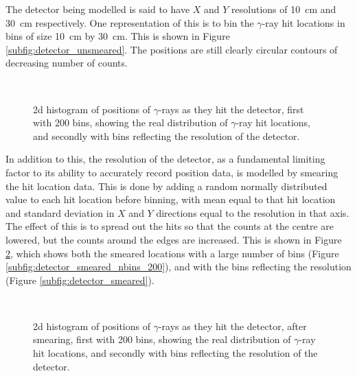 The detector being modelled is said to have $X$ and $Y$ resolutions of \SI{10}{\centi\metre} and \SI{30}{\centi\metre} respectively. One representation of this is to bin the $\gamma$-ray hit locations in bins of size \SI{10}{\centi\metre} by \SI{30}{\centi\metre}. This is shown in Figure \ref{subfig:detector_unsmeared}. The positions are still clearly circular contours of decreasing number of counts.

\begin{figure}
    \centering
     \\
    \caption{2d histogram of positions of $\gamma$-rays as they hit the detector, first with 200 bins, showing the real distribution of $\gamma$-ray hit locations, and secondly with bins reflecting the resolution of the detector.}
    \label{fig:detector_unsmeared}
\end{figure}

In addition to this, the resolution of the detector, as a fundamental limiting factor to its ability to accurately record position data, is modelled by smearing the hit location data. This is done by adding a random normally distributed value to each hit location before binning, with mean equal to that hit location and standard deviation in $X$ and $Y$ directions equal to the resolution in that axis. The effect of this is to spread out the hits so that the counts at the centre are lowered, but the counts around the edges are increased. This is shown in Figure \ref{fig:detector_smeared}, which shows both the smeared locations with a large number of bins (Figure \ref{subfig:detector_smeared_nbins_200}), and with the bins reflecting the resolution (Figure \ref{subfig:detector_smeared}).

\begin{figure}
    \centering
     \\
    \caption{2d histogram of positions of $\gamma$-rays as they hit the detector, after smearing, first with 200 bins, showing the real distribution of $\gamma$-ray hit locations, and secondly with bins reflecting the resolution of the detector.}
    \label{fig:detector_smeared}
\end{figure}

